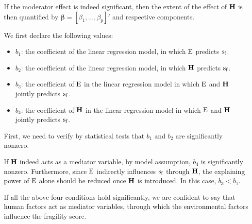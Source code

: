 If the moderator effect is indeed significant, then the extent of the effect of $\operatorname*{\mathbf{H}}$ is then quantified by $\mathbf{\beta} = \left[\beta_1,\ldots,\beta_p\right]'$ and respective components.


We first declare the following values:
\begin{itemize}
   \item $b_1$: the coefficient of the linear regression model, in which $\operatorname*{E}$ predicts $\operatorname*{s_f}$.
   \item $b_2$: the coefficient of the linear regression model, in which $\operatorname*{\mathbf{H}}$ predicts $\operatorname*{s_f}$.
   \item $b_3$: the coefficient of $\operatorname*{E}$ in the linear regression model in which $\operatorname*{E}$ and $\operatorname*{\mathbf{H}}$ jointly predicts $\operatorname*{s_f}$.
   \item $b_4$: the coefficient of $\operatorname*{\mathbf{H}}$ in the linear regression model in which $\operatorname*{E}$ and $\operatorname*{\mathbf{H}}$ jointly predicts $\operatorname*{s_f}$.
\end{itemize}

First, we need to verify by statistical tests that $b_1$ and $b_2$ are significantly nonzero.

If $\operatorname*{\mathbf{H}}$ indeed acts as a mediator variable, by model assumption, $b_4$ is significantly nonzero. Furthermore, since $\operatorname*{E}$ indirectly influences $\operatorname*{s_f}$ through $\operatorname*{\mathbf{H}}$, the explaining power of $\operatorname*{E}$ alone should be reduced once $\operatorname*{\mathbf{H}}$ is introduced. In this case, $b_3 < b_1$.

If all the above four conditions hold significantly, we are confident to say that human factors act as mediator variables, through which the environmental factors influence the fragility score.